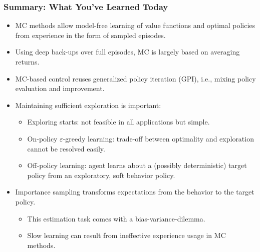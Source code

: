 \begin{frame}
\frametitle{Summary: What You've Learned Today}
\begin{itemize}
	\item MC methods allow model-free learning of value functions and optimal policies from experience in the form of sampled episodes.
	\item Using deep back-ups over full episodes, MC is largely based on averaging returns. \pause
	\item MC-based control reuses generalized policy iteration (GPI), i.e., mixing policy evaluation and improvement. \pause
	\item Maintaining sufficient exploration is important:
	\begin{itemize}
		\item Exploring starts: not feasible in all applications but simple.
		\item On-policy $\varepsilon$-greedy learning: trade-off between optimality and exploration cannot be resolved easily.
		\item Off-policy learning: agent learns about a (possibly deterministic) target policy from an exploratory, soft behavior policy.
	\end{itemize}\pause
	\item Importance sampling transforms expectations from the behavior to the target policy.
	\begin{itemize}
		\item This estimation task comes with a bias-variance-dilemma.
		\item Slow learning can result from ineffective experience usage in MC methods.
	\end{itemize}
\end{itemize}
\end{frame}

